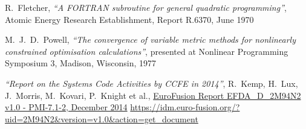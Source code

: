 \begin{thebibliography}{99}
R.\ Fletcher,
\textit{``A FORTRAN subroutine for general quadratic programming''},
Atomic Energy Research Establishment, Report R.6370, June 1970

M.\ J.\ D.\ Powell,
\textit{``The convergence of variable metric methods for nonlinearly
  constrained optimisation calculations''},
presented at Nonlinear Programming Symposium 3, Madison, Wisconsin, 1977

\textit{``Report on the Systems Code Activities by CCFE in 2014''},
R.\ Kemp, H.\ Lux, J.\ Morris, M.\ Kovari, P.\ Knight et al.,
\href{https://idm.euro-fusion.org/?uid=2M94N2\&version=v1.0\&action=get\_document}
{EuroFusion Report EFDA\_D\_2M94N2 v1.0 - PMI-7.1-2, December 2014}
\url{https://idm.euro-fusion.org/?uid=2M94N2\&version=v1.0\&action=get\_document}

\end{thebibliography}

